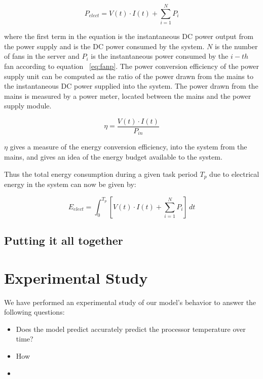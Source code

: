 \documentclass[times, 10pt,onecolumn]{article}
\begin{document}
\begin{equation}
\label{eq:elect}
P_{elect}=  V(t) \cdot I(t) + \sum_{i=1}^NP_{i}
\end{equation} 

where the first term in the equation is the instantaneous DC power
output from the power supply and is the DC power consumed by the
system. $N$ is the number of fans in the server and $P_{i}$ is the
instantaneous power consumed by the $i-th$ fan according to equation
~\ref{eq:fanp}. The power conversion efficiency of the power supply unit
can be computed as the ratio of the power drawn from the mains to the
instantaneous DC power supplied into the system. The power drawn from
the mains is measured by a power meter, located between the mains and
the power supply module.

\begin{equation}
\label{eq:elect}
\eta=  \frac{V(t) \cdot I(t)}{P_{in}}
\end{equation} 

$\eta$ gives a measure of the energy conversion efficiency, into the
system from the mains, and gives an idea of the energy budget available
to the system.

Thus the total energy consumption during a given task period $T_{p}$ due
to electrical energy in the system can now be given by:

\begin{equation}
\label{eq:elect}
E_{elect} =  \int^{T_{p}}_0 [V(t) \cdot I(t) + \sum_{i=1}^NP_{i}]\,dt
\end{equation} 

\subsection{Putting it all together}
\label{sec:wholemodel}


\section{Experimental Study}
\label{sec:experiment}
We have performed an experimental study of our model's behavior to answer the
following questions:
\begin{itemize}
\item Does the model predict accurately predict the processor
  temperature over time?
\item How 
\item 
\end{itemize}
\end{document}
